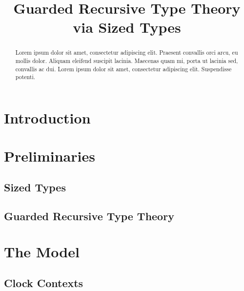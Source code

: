 \documentclass{amsart}
\title{Guarded Recursive Type Theory via Sized Types}
\begin{document}
\maketitle

\begin{abstract}
Lorem ipsum dolor sit amet, consectetur adipiscing elit. Praesent convallis orci arcu, eu mollis dolor. Aliquam eleifend suscipit lacinia. Maecenas quam mi, porta ut lacinia sed, convallis ac dui. Lorem ipsum dolor sit amet, consectetur adipiscing elit. Suspendisse potenti. 
 \end{abstract}

\section{Introduction}
\cite{atkey2013productive}

\section{Preliminaries}
























\subsection{Sized Types}

\subsection{Guarded Recursive Type Theory}

\section{The Model}

\subsection{Clock Contexts}
\end{document}
